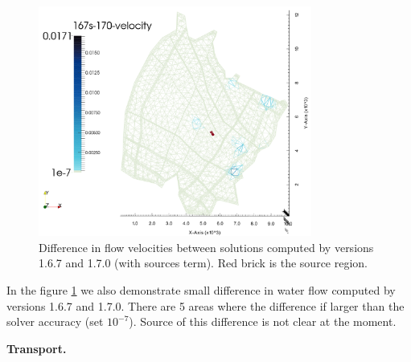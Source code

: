 \begin{figure}
        \centering
        \includegraphics[width=0.8\textwidth]{tests_graphics/mel_167s-170_velocity.pdf}
        \caption{Difference in flow velocities between solutions computed by versions 1.6.7 and 1.7.0 (with sources term).
                 Red brick is the source region.}
        \label{fig:bench_mel2}
\end{figure}


In the figure \ref{fig:bench_mel2} we also demonstrate small difference in water flow computed by versions 1.6.7 and 1.7.0. 
There are 5 areas where the difference if larger than the solver accuracy (set $10^{-7}$). Source of this difference 
is not clear at the moment.

\textbf{Transport.}



